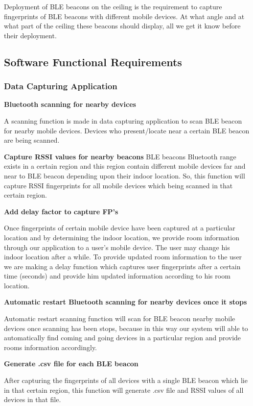 Deployment of BLE beacons on the ceiling is the requirement to capture fingerprints of BLE beacons with different mobile devices. At what angle and at what part of the ceiling these beacons should display, all we get it know before their deployment.

\subsection{Software Functional Requirements}
\subsubsection{Data Capturing Application}
\textbf{Bluetooth scanning for nearby devices}

A scanning function is made in data capturing application to scan BLE beacon for nearby mobile devices. Devices who present/locate near a certain BLE beacon are being scanned.

\textbf{Capture RSSI values for nearby beacons}
BLE beacons Bluetooth range exists in a certain region and this region contain different mobile devices far and near to BLE beacon depending upon their indoor location. So, this function will capture RSSI fingerprints for all mobile devices which being scanned in that certain region.

\textbf{Add delay factor to capture FP’s}
 
Once fingerprints of certain mobile device have been captured at a particular location and by determining the indoor location, we provide room information through our application to a user’s mobile device. The user may change his indoor location after a while. To provide updated room information to the user we are making a delay function which captures user fingerprints after a certain time (seconds) and provide him updated information according to his room location.

\textbf{Automatic restart Bluetooth scanning for nearby devices once it stops}
 
Automatic restart scanning function will scan for BLE beacon nearby mobile devices once scanning has been stops, because in this way our system will able to automatically find coming and going devices in a particular region and provide rooms information accordingly.

\textbf{Generate .csv file for each BLE beacon}
 
After capturing the fingerprints of all devices with a single BLE beacon which lie in that certain region, this function will generate .csv file and RSSI values of all devices in that file.


